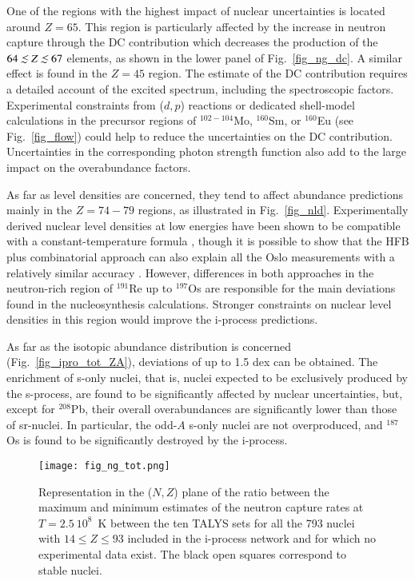 \documentclass{aa}
\def\la{\,\,\raise0.14em\hbox{$<$}\kern-0.76em\lower0.28em\hbox{$\sim$}\,\,}
\begin{document}
One of the regions with the highest impact of nuclear uncertainties is located around $Z=65$. This region is particularly affected by the increase in neutron capture through the DC contribution which decreases the production of the $64 \la Z \la 67$ elements, as shown in the lower panel of Fig.~\ref{fig_ng_dc}. A similar effect is found in the $Z=45$ region. The estimate of the DC contribution requires a detailed account of the excited spectrum, including the spectroscopic factors. Experimental constraints from ($d,p$) reactions or dedicated shell-model calculations in the precursor regions of $^{102-104}$Mo, $^{160}$Sm, or $^{160}$Eu (see Fig.~\ref{fig_flow}) could help to reduce the uncertainties on the DC contribution. Uncertainties in the corresponding photon strength function also add to the large impact on the overabundance factors.

As far as level densities are concerned, they tend to affect abundance predictions mainly in the $Z=74-79$ regions, as illustrated in Fig.~\ref{fig_nld}. Experimentally derived nuclear level densities at low energies have been shown to be compatible with a constant-temperature formula \cite[e.g.][]{Giacoppo14,Tornyi14}, though it is possible to show that the HFB plus combinatorial approach can also explain all the Oslo measurements with a relatively similar accuracy \citep{Goriely08b}. However, differences in both approaches in the neutron-rich region of $^{191}$Re up to $^{197}$Os are responsible for the main deviations found in the nucleosynthesis calculations. Stronger constraints on nuclear level densities in this region would improve the i-process predictions.

As far as the isotopic abundance distribution is concerned (Fig.~\ref{fig_ipro_tot_ZA}), deviations of up to 1.5 dex can be obtained. The enrichment of s-only nuclei, that is, nuclei expected to be exclusively produced by the s-process, are found to be significantly affected by nuclear uncertainties, but, except for $^{208}$Pb, their overall overabundances are significantly lower than those of sr-nuclei. In particular, the odd-$A$ s-only nuclei are not overproduced, and $^{187}$Os is found to be significantly destroyed by the i-process.
\begin{figure}
\texttt{[image: fig\_ng\_tot.png]}
\caption{Representation in the ($N,Z$) plane of the ratio between the maximum and minimum estimates of the neutron
capture rates at $T = 2.5~10^8$~K between the ten {\sf TALYS} sets for all the 793 nuclei with $14 \le Z \le 93$ included in the i-process network and
for which no experimental data exist. The black open squares correspond to stable nuclei.
}
\label{fig_ng_tot}
\end{figure}
\end{document}
